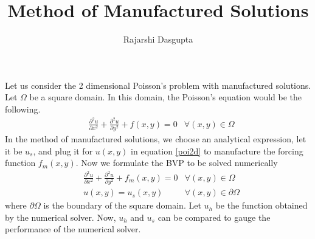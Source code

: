 \documentclass{article}
\title{Method of Manufactured Solutions}
\author{
	Rajarshi Dasgupta
	}
\newcommand{\pdbder}[2]{\frac{\partial^2 #1}{\partial #2^2}}
\begin{document}
\maketitle

Let us consider the 2 dimensional Poisson's problem
with manufactured solutions.
Let $\Omega$ be a square domain.
In this domain,
the Poisson's equation would be the following.
\begin{align}
  &\pdbder{u}{x} + \pdbder{u}{y} + f(x,y) = 0 & \forall (x,y) \in \Omega
  \label{poi2d}
\end{align}
In the method of manufactured solutions,
we choose an analytical expression,
let it be $u_s$,
and plug it for $u(x,y)$ in equation \ref{poi2d}
to manufacture the forcing function $f_m(x,y)$.
Now we formulate the BVP to be solved numerically
\begin{align*}
  &\pdbder{u}{x} + \pdbder{u}{y} + f_m(x,y) = 0 & \forall (x,y) \in \Omega \\
  &u(x,y) = u_s(x,y) & \forall (x,y) \in \partial \Omega
\end{align*}
where $\partial \Omega$ is the boundary of the square domain.
Let $u_h$ be the function obtained by the numerical solver.
Now,
$u_h$ and $u_s$ can be compared
to gauge the performance of the numerical solver.
\end{document}
